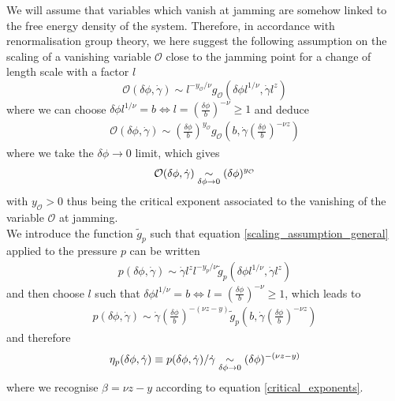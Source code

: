 \documentclass[class=article, float=false, crop=false]{standalone}
\begin{document}
We will assume that variables which vanish at jamming are somehow linked to the free energy density of the system. Therefore, in accordance with renormalisation group theory, we here suggest the following assumption on the scaling of a vanishing variable $\mathcal{O}$ close to the jamming point for a change of length scale with a factor $l$ 
\begin{equation}
\mathcal{O}(\delta\phi,\dot{\gamma}) \sim l^{-y_{\mathcal{O}}/\nu} g_{\mathcal{O}}(\delta\phi l^{1/\nu},\dot{\gamma}l^z)
\label{scaling_assumption_general}
\end{equation}
where we can choose $\delta\phi l^{1/\nu}=b \Leftrightarrow l=\left(\frac{\delta\phi}{b}\right)^{-\nu} \ge 1$ and deduce
\begin{align*}
\mathcal{O}(\delta\phi,\dot{\gamma}) \sim \left(\frac{\delta\phi}{b}\right)^{y_{\mathcal{O}}} g_{\mathcal{O}}\left(b,\dot{\gamma}\left(\frac{\delta\phi}{b}\right)^{-\nu z}\right)
\end{align*}
where we take the $\delta\phi\rightarrow0$ limit, which gives
\begin{equation}
\mathcal{O}(\delta\phi,\dot{\gamma}) \underset{\delta\phi\rightarrow0}{\sim} (\delta\phi)^{y_{\mathcal{O}}}
\end{equation}
with $y_{\mathcal{O}} > 0$ thus being the critical exponent associated to the vanishing of the variable $\mathcal{O}$ at jamming.\\

We introduce the function $\tilde{g}_p$ such that equation \ref{scaling_assumption_general} applied to the pressure $p$ can be written
\begin{align*}
p(\delta\phi,\dot{\gamma}) \sim \dot{\gamma} l^z l^{-y_p/\nu} \tilde{g}_p(\delta\phi l^{1/\nu},\dot{\gamma}l^z)
\end{align*}
and then choose $l$ such that $\delta\phi l^{1/\nu} = b \Leftrightarrow l = \left(\frac{\delta\phi}{b}\right)^{-\nu} \ge 1$, which leads to
\begin{align*}
p(\delta\phi,\dot{\gamma}) \sim \dot{\gamma} \left(\frac{\delta\phi}{b}\right)^{-(\nu z-y)} \tilde{g}_p\left(b,\dot{\gamma}\left(\frac{\delta\phi}{b}\right)^{-\nu z}\right)
\end{align*}
and therefore
\begin{equation}
\eta_p(\delta\phi,\dot{\gamma}) \equiv p(\delta\phi,\dot{\gamma})/\dot{\gamma} \underset{\delta\phi\rightarrow0}{\sim} (\delta\phi)^{-(\nu z-y)}
\end{equation}
where we recognise $\beta=\nu z-y$ according to equation \ref{critical_exponents}.\\
\end{document}

